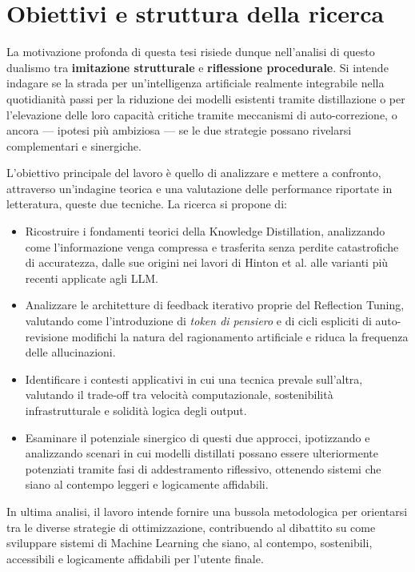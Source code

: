 \section{Obiettivi e struttura della ricerca}
\label{sec:obiettivi}

La motivazione profonda di questa tesi risiede dunque nell'analisi di questo dualismo tra \textbf{imitazione strutturale} e \textbf{riflessione procedurale}. Si intende indagare se la strada per un'intelligenza artificiale realmente integrabile nella quotidianità passi per la riduzione dei modelli esistenti tramite distillazione o per l'elevazione delle loro capacità critiche tramite meccanismi di auto-correzione, o ancora — ipotesi più ambiziosa — se le due strategie possano rivelarsi complementari e sinergiche.

L'obiettivo principale del lavoro è quello di analizzare e mettere a confronto, attraverso un'indagine teorica e una valutazione delle performance riportate in letteratura, queste due tecniche. La ricerca si propone di:
\begin{itemize}
    \item Ricostruire i fondamenti teorici della Knowledge Distillation, analizzando come l'informazione venga compressa e trasferita senza perdite catastrofiche di accuratezza, dalle sue origini nei lavori di Hinton et al. alle varianti più recenti applicate agli LLM.
    \item Analizzare le architetture di feedback iterativo proprie del Reflection Tuning, valutando come l'introduzione di \textit{token di pensiero} e di cicli espliciti di auto-revisione modifichi la natura del ragionamento artificiale e riduca la frequenza delle allucinazioni.
    \item Identificare i contesti applicativi in cui una tecnica prevale sull'altra, valutando il trade-off tra velocità computazionale, sostenibilità infrastrutturale e solidità logica degli output.
    \item Esaminare il potenziale sinergico di questi due approcci, ipotizzando e analizzando scenari in cui modelli distillati possano essere ulteriormente potenziati tramite fasi di addestramento riflessivo, ottenendo sistemi che siano al contempo leggeri e logicamente affidabili.
\end{itemize}

In ultima analisi, il lavoro intende fornire una bussola metodologica per orientarsi tra le diverse strategie di ottimizzazione, contribuendo al dibattito su come sviluppare sistemi di Machine Learning che siano, al contempo, sostenibili, accessibili e logicamente affidabili per l'utente finale.


